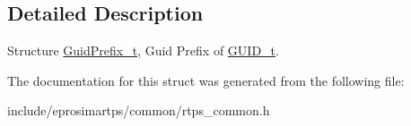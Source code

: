 \subsection{\-Detailed \-Description}
\-Structure \hyperlink{structeprosima_1_1rtps_1_1_guid_prefix__t}{\-Guid\-Prefix\-\_\-t}, \-Guid \-Prefix of \hyperlink{structeprosima_1_1rtps_1_1_g_u_i_d__t}{\-G\-U\-I\-D\-\_\-t}. 

\-The documentation for this struct was generated from the following file\-:\begin{DoxyCompactItemize}
\item 
include/eprosimartps/common/rtps\-\_\-common.\-h\end{DoxyCompactItemize}
